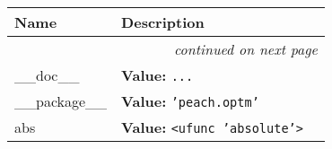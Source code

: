    \vspace{-1cm}
\hspace{\varindent}\begin{longtable}{|p{\varnamewidth}|p{\vardescrwidth}|l}
\cline{1-2}
\cline{1-2} \centering \textbf{Name} & \centering \textbf{Description}& \\
\cline{1-2}
\endhead\cline{1-2}\multicolumn{3}{r}{\small\textit{continued on next page}}\\\endfoot\cline{1-2}
\endlastfoot\raggedright \_\-\_\-d\-o\-c\-\_\-\_\- & \raggedright \textbf{Value:} 
{\tt \texttt{...}}&\\
\cline{1-2}
\raggedright \_\-\_\-p\-a\-c\-k\-a\-g\-e\-\_\-\_\- & \raggedright \textbf{Value:} 
{\tt \texttt{'}\texttt{peach.optm}\texttt{'}}&\\
\cline{1-2}
\raggedright a\-b\-s\- & \raggedright \textbf{Value:} 
{\tt {\textless}ufunc 'absolute'{\textgreater}}&\\
\cline{1-2}
\end{longtable}

